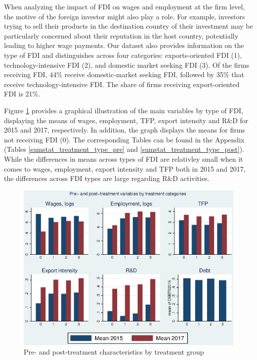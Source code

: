 When analyzing the impact of FDI on wages and employment at the firm level, the  motive of the foreign investor might also play a role. For example, investors trying to sell their products in the destination country of their investment  may be particularly concerned about their reputation in the host country, potentially leading to higher wage payments. Our dataset also provides information on the type of FDI and distinguishes across four categories: exports-oriented FDI (1),  technology-intensive FDI (2), and domestic market seeking FDI (3). Of the firms receiving FDI, 44\% receive domestic-market seeking FDI, followed by 35\% that receive technology-intensive FDI. The share of firms receiving export-oriented FDI is 21\%. \\ \par

Figure \ref{fig_treatment_type} provides a graphical illustration of the main variables by type of FDI, displaying the means of wages, employment, TFP, export intensity and R\&D for 2015 and 2017, respectively. In addition, the graph displays the means for firms not receiving FDI (0). The corresponding Tables can be found in the Appendix (Tables \ref{sumstat_treatment_type_pre} and \ref{sumstat_treatment_type_post}). While the differences in means across types of FDI are relativley small when it comes to wages, employment, export intensity and TFP both in 2015 and 2017, the differences across FDI types are large regarding R\&D activities.\\ \par

 
\begin{figure}[htbp!]\caption{Pre- and post-treatment characteristics by treatment group}\label{fig_treatment_type}
	\begin{center}
		\includegraphics[scale=1]{figures_and_tables/bar_pre_post} 
	\end{center}
\end{figure}


